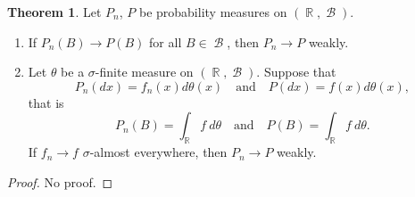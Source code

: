 \documentclass[12pt,a4paper]{report}
\theoremstyle{definition}
\newtheorem{theorem}{Theorem}[chapter] %
\theoremstyle{num.custom-title}
\DeclareMathOperator{\B}{\mathcal{B}}
\DeclareMathOperator{\R}{\mathbb{R}}
\renewcommand{\1}{\mathbbm{1}}
\begin{document}
\begin{theorem}
Let $P_n$, $P$ be probability measures on $(\R,\B)$.
\begin{enumerate}
\item If $P_n(B) \to P(B)$ for all $B \in \B$, then $P_n \to P$ weakly.
\item Let $\theta$ be a $\sigma$-finite measure on $(\R,\B)$. Suppose that
\[
P_n(dx) = f_n(x) d\theta(x) \quad \text{and} \quad P(dx) = f(x) d\theta(x),
\]
that is
\[
P_n(B) = \int_{\R} f \ d\theta \quad \text{and} \quad P(B) = \int_{\R} f \ d\theta.
\]
If $f_n \to f$ $\sigma$-almost everywhere, then $P_n \to P$ weakly.
\end{enumerate}
\begin{proof}
No proof.
\end{proof}
\end{theorem}
\end{document}
